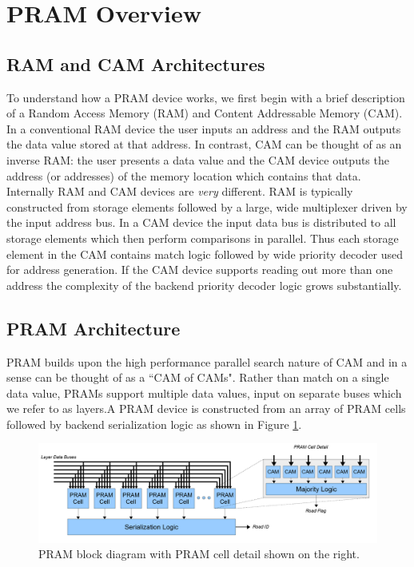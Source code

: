 \documentclass[letterpaper]{article}
\begin{document}
\section{PRAM Overview}

\subsection{RAM and CAM Architectures}

To understand how a PRAM device works, we first begin with a brief description of a Random Access Memory (RAM) and Content Addressable Memory (CAM). In a conventional RAM device the user inputs an address and the RAM outputs the data value stored at that address. In contrast, CAM can be thought of as an inverse RAM: the user presents a data value and the CAM device outputs the address (or addresses) of the memory location which contains that data. Internally RAM and CAM devices are \emph{very} different. RAM is typically constructed from storage elements followed by a large, wide multiplexer driven by the input address bus. In a CAM device the input data bus is distributed to all storage elements which then perform comparisons in parallel. Thus each storage element in the CAM contains match logic followed by wide priority decoder used for address generation. If the CAM device supports reading out more than one address the complexity of the backend priority decoder logic grows substantially.

\subsection{PRAM Architecture}

PRAM builds upon the high performance parallel search nature of CAM and in a sense can be thought of as a ``CAM of CAMs". Rather than match on a single data value, PRAMs support multiple data values, input on separate buses which we refer to as layers.A PRAM device is constructed from an array of PRAM cells followed by backend serialization logic as shown in Figure \ref{pramblock}.

\begin{figure}
\centering
\includegraphics[width=14cm]{pram.png}
\caption[PRAM Block Diagram]{PRAM block diagram with PRAM cell detail shown on the right.}
\label{pramblock}
\end{figure}
\end{document}
